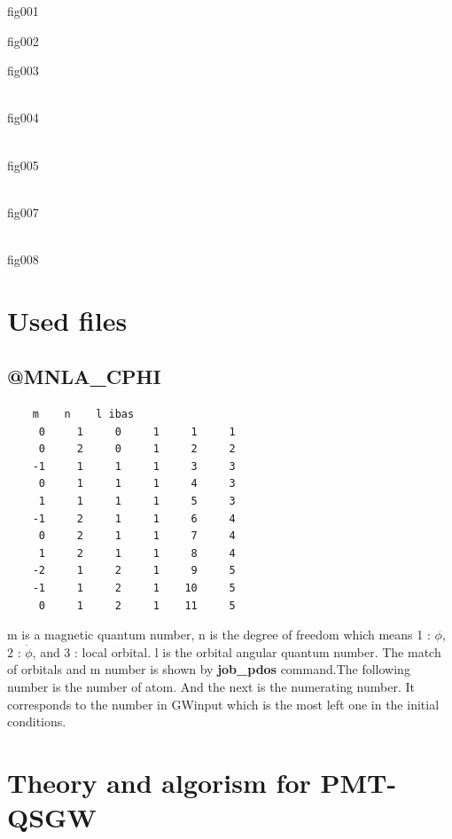 \documentclass[a4paper,10pt,epsf,fleqn]{article}
\newcommand{\figp}[1]{\rotatebox{-90}{\texttt{[image: \#1]}}}
\begin{document}
\figp{gas_fig001.eps}

fig001

\figp{gas_fig002.eps}

fig002

\figp{gas_fig003.eps}

fig003


\figp{gas_fig004.eps}\\
fig004

\figp{gas_fig005.eps}\\
fig005

\figp{gas_fig007.eps}\\
fig007

\figp{gas_fig008.eps}\\
fig008


\section{Used files} 
\subsection{@MNLA\_CPHI}
\begin{verbatim}
    m    n    l ibas
     0     1     0     1     1     1
     0     2     0     1     2     2
    -1     1     1     1     3     3
     0     1     1     1     4     3
     1     1     1     1     5     3
    -1     2     1     1     6     4
     0     2     1     1     7     4
     1     2     1     1     8     4
    -2     1     2     1     9     5
    -1     1     2     1    10     5
     0     1     2     1    11     5
\end{verbatim}
m is a magnetic quantum number, n is the degree of freedom which means 1 : $\phi$, 2 : $\dot{\phi}$, and 3 : local orbital. l is the orbital angular quantum number. The match of orbitals and m number is shown by {\bf job\_pdos} command.The following number is the number of atom. And the next is the numerating number. It corresponds to the number in GWinput which is the most left one in the initial conditions.


\newpage
\section{Theory and algorism for PMT-QSGW}
\end{document}
